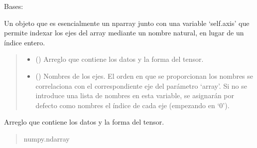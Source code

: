 \documentclass[letterpaper,10pt,english]{sphinxmanual}
\begin{document}
\begin{fulllineitems}
\label{\detokenize{myutils:myutils.tensor.Tensor}}
\pysigstartsignatures
{}
\pysigstopsignatures
\sphinxAtStartPar
Bases: 

\sphinxAtStartPar
Un objeto que es esencialmente un nparray junto con una variable ‘self.axis’ que permite indexar los ejes del array mediante un nombre natural, en lugar de un índice entero.
\begin{quote}\begin{description}
\begin{itemize}
\item {} 
\sphinxAtStartPar
{} () \textendash{} Arreglo que contiene los datos y la forma del tensor.

\item {} 
\sphinxAtStartPar
{} (\sphinxstyleliteralemphasis{\sphinxupquote{, }}) \textendash{} Nombres de los ejes. El orden en que se proporcionan los nombres se correlaciona
con el correspondiente eje del parámetro ‘array’. Si no se introduce una lista de nombres en esta variable,
se asignarán por defecto como nombres el índice de cada eje (empezando en ‘0’).

\end{itemize}

\end{description}\end{quote}

\begin{fulllineitems}
\label{\detokenize{myutils:myutils.tensor.Tensor.array}}
\pysigstartsignatures
{}
\pysigstopsignatures
\sphinxAtStartPar
Arreglo que contiene los datos y la forma del tensor.
\begin{quote}\begin{description}
\sphinxAtStartPar
numpy.ndarray


\end{description}
\end{quote}
\end{fulllineitems}
\end{fulllineitems}
\end{document}
